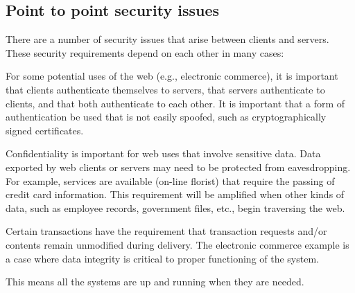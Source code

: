 \subsection{Point to point security issues}
There are a number of security issues that arise between clients and
servers. These security requirements depend on each other in many cases:

\begin{htmllist}
  \item[Authentication:] For some potential uses of the web (e.g.,
    electronic commerce), it is important that clients authenticate
    themselves to servers, that servers authenticate to clients, and that
    both authenticate to each other. It is important that a form of
    authentication be used that is not easily spoofed, such as
    cryptographically signed certificates.
  \item[Confidentiality:] Confidentiality is important for web uses that
    involve sensitive data. Data exported by web clients or servers may
    need to be protected from eavesdropping. For example, services are
    available (on-line florist) that require the passing of credit card
    information. This requirement will be amplified when other kinds of
    data, such as employee records, government files, etc., begin
    traversing the web.
  \item[Integrity:] Certain transactions have the requirement that
    transaction requests and/or contents remain unmodified during delivery.
    The electronic commerce example is a case where data integrity is
    critical to proper functioning of the system.
  \item[Availibility:] This means all the systems are up and running when
    they are needed.
\end{htmllist}
